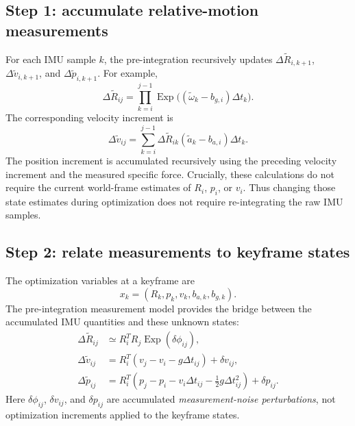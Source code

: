 \documentclass[11pt,a4paper]{article}
\newcommand{\Exp}{\operatorname{Exp}}
\begin{document}
\subsection{Step 1: accumulate relative-motion measurements}
For each IMU sample $k$, the pre-integration recursively updates
$\Delta\tilde R_{i,k+1}$, $\Delta\tilde v_{i,k+1}$, and
$\Delta\tilde p_{i,k+1}$. For example,
\begin{equation}
\Delta\tilde R_{ij}=\prod_{k=i}^{j-1}
\Exp\bigl((\tilde\omega_k-b_{g,i})\Delta t_k\bigr).
\end{equation}
The corresponding velocity increment is
\begin{equation}
\Delta\tilde v_{ij}=\sum_{k=i}^{j-1}
\Delta\tilde R_{ik}(\tilde a_k-b_{a,i})\Delta t_k.
\end{equation}
The position increment is accumulated recursively using the preceding
velocity increment and the measured specific force. Crucially, these
calculations do not require the current world-frame estimates of
$R_i$, $p_i$, or $v_i$. Thus changing those state estimates during
optimization does not require re-integrating the raw IMU samples.

\subsection{Step 2: relate measurements to keyframe states}
The optimization variables at a keyframe are
\begin{equation}
x_k=(R_k,p_k,v_k,b_{a,k},b_{g,k}).
\end{equation}
The pre-integration measurement model provides the bridge between the
accumulated IMU quantities and these unknown states:
\begin{subequations}\label{eq:concept_measurement_model}
\begin{align}
\Delta\tilde R_{ij}
&\simeq R_i^TR_j\Exp(\delta\phi_{ij}),\\
\Delta\tilde v_{ij}
&=R_i^T(v_j-v_i-g\Delta t_{ij})+\delta v_{ij},\\
\Delta\tilde p_{ij}
&=R_i^T\!\left(p_j-p_i-v_i\Delta t_{ij}
-\tfrac12g\Delta t_{ij}^2\right)+\delta p_{ij}.
\end{align}
\end{subequations}
Here $\delta\phi_{ij}$, $\delta v_{ij}$, and $\delta p_{ij}$
are accumulated \emph{measurement-noise perturbations}, not optimization
increments applied to the keyframe states.
\end{document}
